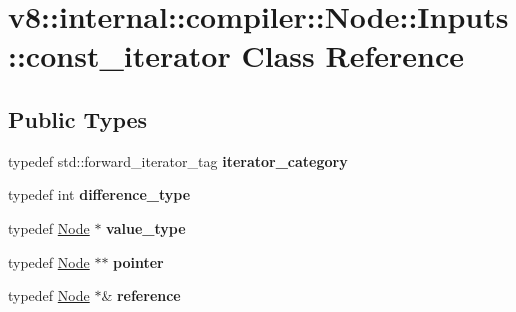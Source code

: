 \hypertarget{classv8_1_1internal_1_1compiler_1_1_node_1_1_inputs_1_1const__iterator}{}\section{v8\+:\+:internal\+:\+:compiler\+:\+:Node\+:\+:Inputs\+:\+:const\+\_\+iterator Class Reference}
\label{classv8_1_1internal_1_1compiler_1_1_node_1_1_inputs_1_1const__iterator}
\subsection*{Public Types}
\begin{DoxyCompactItemize}
\item 
typedef std\+::forward\+\_\+iterator\+\_\+tag {\bfseries iterator\+\_\+category}\hypertarget{classv8_1_1internal_1_1compiler_1_1_node_1_1_inputs_1_1const__iterator_a76e0b1f409d6068bee5c403628a87095}{}\label{classv8_1_1internal_1_1compiler_1_1_node_1_1_inputs_1_1const__iterator_a76e0b1f409d6068bee5c403628a87095}

\item 
typedef int {\bfseries difference\+\_\+type}\hypertarget{classv8_1_1internal_1_1compiler_1_1_node_1_1_inputs_1_1const__iterator_a77a2c82f062f035b3be8ebc1d22a566b}{}\label{classv8_1_1internal_1_1compiler_1_1_node_1_1_inputs_1_1const__iterator_a77a2c82f062f035b3be8ebc1d22a566b}

\item 
typedef \hyperlink{classv8_1_1internal_1_1compiler_1_1_node}{Node} $\ast$ {\bfseries value\+\_\+type}\hypertarget{classv8_1_1internal_1_1compiler_1_1_node_1_1_inputs_1_1const__iterator_a329d627c41e3f33033bebfcbc421dda0}{}\label{classv8_1_1internal_1_1compiler_1_1_node_1_1_inputs_1_1const__iterator_a329d627c41e3f33033bebfcbc421dda0}

\item 
typedef \hyperlink{classv8_1_1internal_1_1compiler_1_1_node}{Node} $\ast$$\ast$ {\bfseries pointer}\hypertarget{classv8_1_1internal_1_1compiler_1_1_node_1_1_inputs_1_1const__iterator_a636a3b1dbf993b605a0faa737ec6aedd}{}\label{classv8_1_1internal_1_1compiler_1_1_node_1_1_inputs_1_1const__iterator_a636a3b1dbf993b605a0faa737ec6aedd}

\item 
typedef \hyperlink{classv8_1_1internal_1_1compiler_1_1_node}{Node} $\ast$\& {\bfseries reference}\hypertarget{classv8_1_1internal_1_1compiler_1_1_node_1_1_inputs_1_1const__iterator_ac9071054416c6f916e3da0c4164d7c22}{}\label{classv8_1_1internal_1_1compiler_1_1_node_1_1_inputs_1_1const__iterator_ac9071054416c6f916e3da0c4164d7c22}

\end{DoxyCompactItemize}
